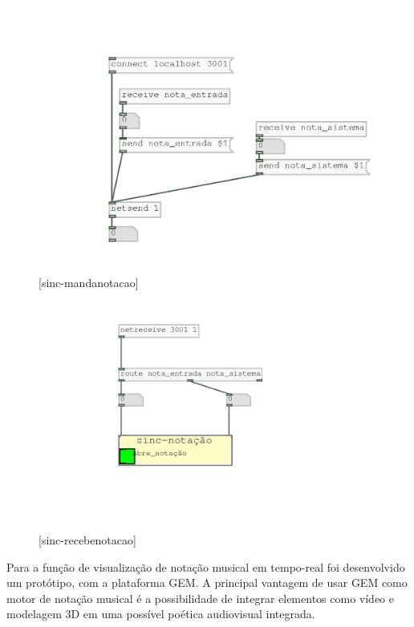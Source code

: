 \documentclass[draft]{ppgmus}
\begin{document}
\begin{figure}
\includegraphics[scale=.6]{sinc-mandanotacao}
\caption{[sinc-mandanotacao]}
\label{sinc-mandanotacao}
\end{figure} 

\begin{figure}
\includegraphics[scale=.6]{sinc-recebenotacao}
\caption{[sinc-recebenotacao]}
\label{sinc-recebenotacao}
\end{figure} 

Para a função de visualização de notação musical
em tempo-real foi desenvolvido um protótipo, com a plataforma GEM.
A principal vantagem de usar GEM como motor de notação musical é a possibilidade
de integrar elementos como vídeo e modelagem 3D em uma possível poética audiovisual integrada.
\end{document}
